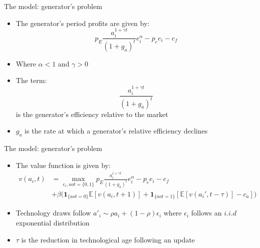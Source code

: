 \documentclass{beamer}
\begin{document}
\begin{frame}{The model: generator's problem}\label{gen_problem}
\begin{itemize}
\item The generator's period profits are given by:
\begin{equation*}
    p_E\frac{a_{i}^{1+\gamma t}}{(1+g_a)^t} e_i^\alpha -p_e e_i-c_f
\end{equation*}

\item Where $\alpha<1$ and $\gamma>0$
 \item The term: \begin{equation*}
     \frac{a_{i}^{1+\gamma t}}{(1+g_a)^t}
 \end{equation*} is the generator's efficiency relative to the market
 \item $g_a$ is the rate at which a generator's relative efficiency declines
    
\end{itemize}

 \hyperlink{intra_period}{}  
 \hyperlink{alt_model}{}   
  \hyperlink{effic_between_model}{}
  \hyperlink{rel_eff_why}{}

    
\end{frame}
\begin{frame}{The model: generator's problem}\label{gen_problem}
\begin{itemize}
\item The value function is given by:
\begin{align*} 
    v(a_{i},t) &= \max_{e_i,aot=\{0,1\}} p_E\frac{a_{i}^{1+\gamma t}}{(1+g_a)^t} e_i^\alpha -p_e e_i-c_f\\ 
    &+\beta \big(\mathbf{1}_{\{aot =0\}} \mathbb{E}[v(a_{i},t+1)] + \mathbf{1}_{\{aot =1\}}[ \mathbb{E}[v(a_{i}',t-\tau)]-c_a]\big)
\end{align*}
\hfill\break
    \item Technology draws follow $a'_i\sim \rho a_i + (1-\rho)\epsilon_i$ where $\epsilon_i$ follows an $i.i.d$ exponential distribution
     \item $\tau$ is the reduction in technological age following an update
    
\end{itemize}

 \hyperlink{intra_period}{}  
 \hyperlink{alt_model}{}   
  \hyperlink{effic_between_model}{}
  \hyperlink{rel_eff_why}{}

    
\end{frame}
\end{document}

